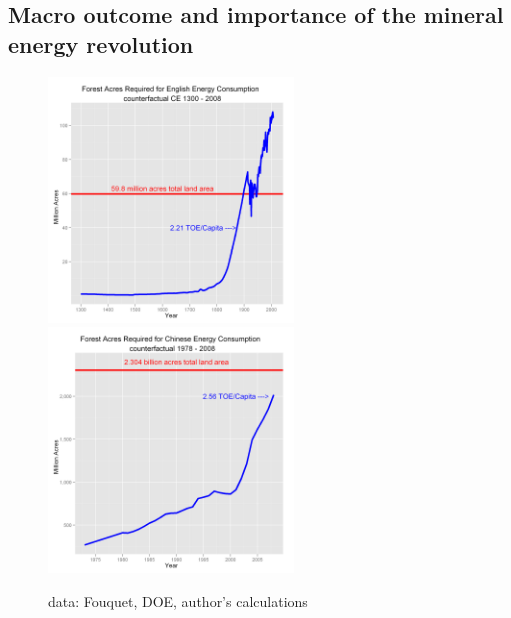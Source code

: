 \documentclass[final]{beamer}
\begin{document}
\subsection{Macro outcome and importance of the mineral energy revolution}	
 	
\begin{frame}
 		\begin{figure}
		\centerline{
		\mbox{\includegraphics[width=0.58\textwidth]{wood.png}}
		\mbox{\includegraphics[width=0.58\textwidth]{chinawood.png}}
		}
		\caption{data: Fouquet, DOE, author's calculations}
		\end{figure}
\end{frame}
\end{document}
